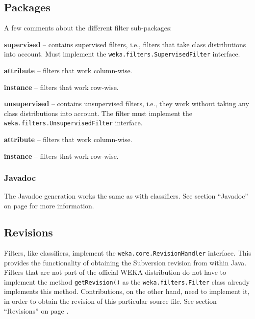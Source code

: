 \subsection{Packages}
A few comments about the different filter sub-packages:
\begin{tight_itemize}
  \item \textbf{supervised} -- contains supervised filters, i.e., filters that
take class distributions into account. Must implement the
\texttt{weka.filters.SupervisedFilter} interface.
  \begin{tight_itemize}
	\item \textbf{attribute} -- filters that work column-wise.
	\item \textbf{instance} -- filters that work row-wise.
  \end{tight_itemize}
  \item \textbf{unsupervised} -- contains unsupervised filters, i.e., they work
without taking any class distributions into account. The filter must implement
the \texttt{weka.filters.UnsupervisedFilter} interface.
  \begin{tight_itemize}
	\item \textbf{attribute} -- filters that work column-wise.
	\item \textbf{instance} -- filters that work row-wise.
  \end{tight_itemize}
\end{tight_itemize}

\subsubsection*{Javadoc}
The Javadoc generation works the same as with classifiers. See section
``Javadoc'' on page \pageref{classifier_javadoc} for more information.

\subsection{Revisions}
\label{filter_revisions}
Filters, like classifiers, implement the \texttt{weka.core.RevisionHandler}
interface. This provides the functionality of obtaining the Subversion revision
from within Java. Filters that are not part of the official WEKA distribution
do not have to implement the method \texttt{getRevision()} as the
\texttt{weka.filters.Filter} class already implements this method.
Contributions, on the other hand, need to implement it, in order to
obtain the revision of this particular source file. See section ``Revisions''
on page \pageref{classifier_revisions}.

